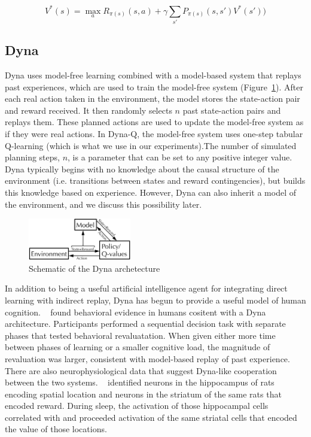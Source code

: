 \documentclass[letterpaper]{article}
\begin{document}
\begin{equation}
V^{*}(s) = \max_a R_{\pi(s)}(s,a) + \gamma \sum\limits_{s'} P_{\pi(s)}(s,s')V^{*}(s'))
\end{equation}

\subsection{Dyna}

Dyna uses model-free learning combined with a model-based system that replays past experiences, which are used to train the model-free system (Figure~\ref{fig:dyna_schematic}). After each real action taken in the environment, the model stores the state-action pair and reward received. It then randomly selects $n$ past state-action pairs and replays them. These planned actions are used to update the model-free system as if they were real actions. In Dyna-Q, the model-free system uses one-step tabular Q-learning (which is what we use in our experiments).The number of simulated planning steps, $n$, is a parameter that can be set to any positive integer value. Dyna typically begins with no knowledge about the causal structure of the environment (i.e. transitions between states and reward contingencies), but builds this knowledge based on experience. However, Dyna can also inherit a model of the environment, and we discuss this possibility later.

\begin{figure}[ht]
\centering
\includegraphics[width=0.4\textwidth]{dyna_schematic}
\caption{Schematic of the Dyna archetecture}
\label{fig:dyna_schematic}
\end{figure}

In addition to being a useful artificial intelligence agent for integrating direct learning with indirect replay, Dyna has begun to provide a useful model of human cognition. ~\cite{gershman2014retrospective} found behavioral evidence in humans cositent with a Dyna architecture.  Participants performed a sequential decision task with separate phases that tested behavioral revaluatation. When given either more time between phases of learning or a smaller cognitive load, the magnitude of revaluation was larger, consistent with model-based replay of past experience. There are also neurophysiological data that suggest Dyna-like cooperation between the two systems. ~\cite{lansink2009hippocampus} identified neurons in the hippocampus of rats encoding spatial location and neurons in the striatum of the same rats that encoded reward. During sleep, the activation of those hippocampal cells correlated with and proceeded activation of the same striatal cells that encoded the value of those locations.
\end{document}
